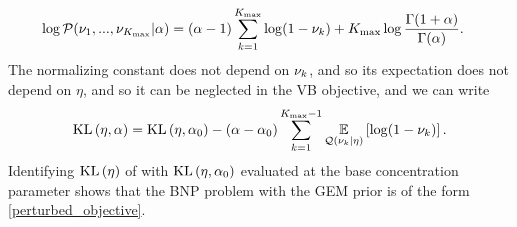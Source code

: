 \begin{ex}
\begin{align*}
%
\log \p(\nu_1, ..., \nu_\kmax \vert \alpha)
    ={}& (\alpha - 1) \sum_{k=1}^\kmax \log (1 - \nuk)
    + \kmax \log \frac{\Gamma(1 + \alpha)}{\Gamma(\alpha)}.
%
\end{align*}
%
The normalizing constant does not depend on $\nu_{k}$, and so its expectation
does not depend on $\eta$, and so it can be neglected in the VB objective,
and we can write
%
\begin{align*}
%
\KL{\eta, \alpha} = \KL{\eta, \alpha_0}
-(\alpha - \alpha_0) \sum_{\k=1}^{\kmax - 1}
    \expect{\q(\nuk \vert \eta)}{\log (1 - \nuk)}.
%
\end{align*}
%
Identifying $\mathrm{KL}\left(\eta\right)$ of  with $\mathrm{KL}\left(\eta, \alpha_0\right)$ evaluated
at the base concentration parameter shows that the BNP problem with the GEM
prior is of the form \eqref{perturbed_objective}.
%
\end{ex}
